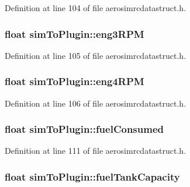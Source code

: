\-Definition at line 104 of file aerosimrcdatastruct.\-h.

\hypertarget{group___aero_sim_r_c_ga12d0b07a1f43644fa7b16c0b53409ef9}{
\subsubsection[{eng3\-R\-P\-M}]{\setlength{\rightskip}{0pt plus 5cm}float {\bf sim\-To\-Plugin\-::eng3\-R\-P\-M}}}\label{group___aero_sim_r_c_ga12d0b07a1f43644fa7b16c0b53409ef9}


\-Definition at line 105 of file aerosimrcdatastruct.\-h.

\hypertarget{group___aero_sim_r_c_gac7d5d72d3237905c99ee5b63859e7df3}{
\subsubsection[{eng4\-R\-P\-M}]{\setlength{\rightskip}{0pt plus 5cm}float {\bf sim\-To\-Plugin\-::eng4\-R\-P\-M}}}\label{group___aero_sim_r_c_gac7d5d72d3237905c99ee5b63859e7df3}


\-Definition at line 106 of file aerosimrcdatastruct.\-h.

\hypertarget{group___aero_sim_r_c_gae96b24ccedba1107673cdc5889815f58}{
\subsubsection[{fuel\-Consumed}]{\setlength{\rightskip}{0pt plus 5cm}float {\bf sim\-To\-Plugin\-::fuel\-Consumed}}}\label{group___aero_sim_r_c_gae96b24ccedba1107673cdc5889815f58}


\-Definition at line 111 of file aerosimrcdatastruct.\-h.

\hypertarget{group___aero_sim_r_c_ga9d9432e29718f1a2d3e3bb4445bb3705}{
\subsubsection[{fuel\-Tank\-Capacity}]{\setlength{\rightskip}{0pt plus 5cm}float {\bf sim\-To\-Plugin\-::fuel\-Tank\-Capacity}}}\label{group___aero_sim_r_c_ga9d9432e29718f1a2d3e3bb4445bb3705}


